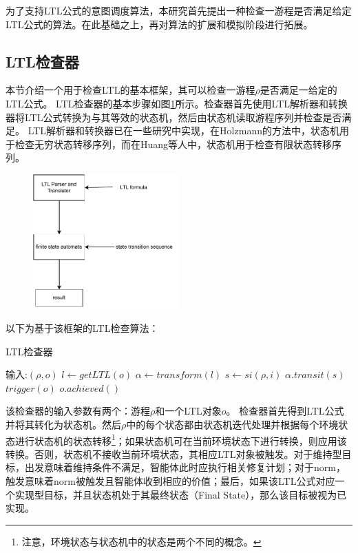 为了支持LTL公式的意图调度算法，本研究首先提出一种检查一游程是否满足给定LTL公式的算法。在此基础之上，再对\SA 算法的扩展和模拟阶段进行拓展。

\subsection{LTL检查器}
本节介绍一个用于检查LTL的基本框架，其可以检查一游程$\rho$是否满足一给定的LTL公式。
LTL检查器的基本步骤如图\ref{fig:translator}所示。检查器首先使用LTL解析器和转换器将LTL公式转换为与其等效的状态机，然后由状态机读取游程序列并检查是否满足。
LTL解析器和转换器已在一些研究中\cite{DBLP:books/daglib/0020982,DBLP:journals/jlap/HuangC22}实现，在Holzmann\cite{DBLP:books/daglib/0020982}的方法中，状态机用于检查无穷状态转移序列，而在Huang等人\cite{DBLP:journals/jlap/HuangC22}中，状态机用于检查有限状态转移序列。

\begin{figure}[htb]
\centering
\includegraphics[width=0.5\textwidth]{./figs/translator}
\label{fig:translator}
\end{figure}

以下为基于该框架的LTL检查算法：
\begin{algorithm} %
\caption{LTL检查器}\label{checker}
\begin{algorithmic}[1]
\STATE 输入:$(\rho, o)$
\STATE $l \gets getLTL(o)$
\STATE $\alpha \gets transform(l)$ 
  \STATE $s \gets si(\rho, i)$
    \STATE $\alpha.transit(s)$
    \ELSE
    \STATE $trigger(o)$
  \ENDIF
\ENDFOR
{}
  \STATE $o.achieved()$
\ENDIF
\end{algorithmic}
\end{algorithm}
该检查器的输入参数有两个：游程$\rho$和一个LTL对象$o$。
%
检查器首先得到LTL公式并将其转化为状态机。然后$\rho$中的每个状态都由状态机迭代处理并根据每个环境状态进行状态机的状态转移\footnote{注意，环境状态与状态机中的状态是两个不同的概念。}；如果状态机可在当前环境状态下进行转换，则应用该转换。否则，状态机不接收当前环境状态，其相应LTL对象被触发。对于维持型目标，出发意味着维持条件不满足，智能体此时应执行相关修复计划；对于norm，触发意味着norm被触发且智能体收到相应的价值；最后，如果该LTL公式对应一个实现型目标，并且状态机处于其最终状态（Final State），那么该目标被视为已实现。

